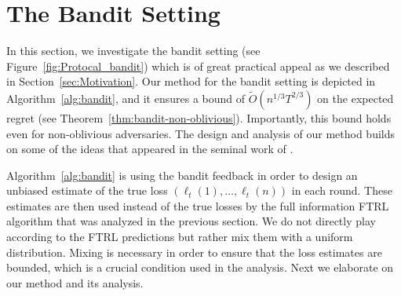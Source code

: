 

\section{The Bandit Setting} \label{sec:bandit}
In this section, we investigate the bandit setting (see Figure~\ref{fig:Protocal_bandit}) which is of great practical appeal as we described in Section~\ref{sec:Motivation}.
Our method for the bandit setting is depicted in Algorithm~\ref{alg:bandit}, and it ensures a bound of $\tilde{O}(n^{1/3}T^{2/3})$ on the expected  regret (see Theorem~\ref{thm:bandit-non-oblivious}). Importantly, this bound holds even for non-oblivious adversaries.
The design and analysis of our method builds on some of the ideas that appeared in the  seminal work of  \cite{auer2002nonstochastic}. 

Algorithm~\ref{alg:bandit} is using the bandit feedback in order to design an unbiased estimate of the true loss  $(\ell_t(1),\ldots,\ell_t(n))$ in each round. These estimates are then used instead of the true losses by the full information FTRL algorithm that was analyzed in the previous section.  We do not directly play according to the FTRL predictions but rather mix them with a uniform distribution. Mixing is necessary in order to ensure that the   loss estimates are bounded, which is  a crucial  condition used in the analysis. Next we elaborate  on our method and its analysis.
%
%
%

